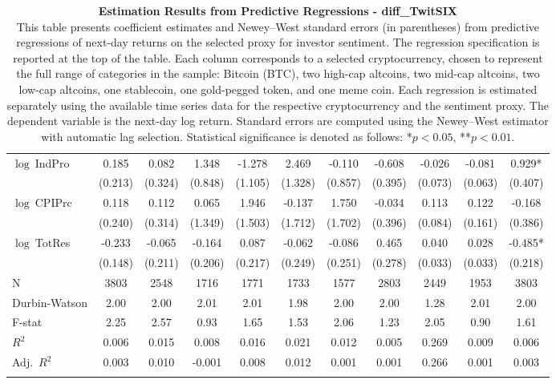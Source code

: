 \begin{table}[ht]
\begin{tabular}{l *{10}{c}}
\addlinespace
$\log\ $IndPro & 0.185 & 0.082 & 1.348 & -1.278 & 2.469 & -0.110 & -0.608 & -0.026 & -0.081 & 0.929* \\
 & (0.213) & (0.324) & (0.848) & (1.105) & (1.328) & (0.857) & (0.395) & (0.073) & (0.063) & (0.407) \\
\addlinespace
$\log\ $CPIPrc & 0.118 & 0.112 & 0.065 & 1.946 & -0.137 & 1.750 & -0.034 & 0.113 & 0.122 & -0.168 \\
 & (0.240) & (0.314) & (1.349) & (1.503) & (1.712) & (1.702) & (0.396) & (0.084) & (0.161) & (0.386) \\
\addlinespace
$\log\ $TotRes & -0.233 & -0.065 & -0.164 & 0.087 & -0.062 & -0.086 & 0.465 & 0.040 & 0.028 & -0.485* \\
 & (0.148) & (0.211) & (0.206) & (0.217) & (0.249) & (0.251) & (0.278) & (0.033) & (0.033) & (0.218) \\
\addlinespace
\midrule
N & 3803 & 2548 & 1716 & 1771 & 1733 & 1577 & 2803 & 2449 & 1953 & 3803 \\
Durbin-Watson & 2.00 & 2.00 & 2.01 & 2.01 & 1.98 & 2.00 & 2.00 & 1.28 & 2.01 & 2.00 \\
F-stat & 2.25 & 2.57 & 0.93 & 1.65 & 1.53 & 2.06 & 1.23 & 2.05 & 0.90 & 1.61 \\
\(R^2\) & 0.006 & 0.015 & 0.008 & 0.016 & 0.021 & 0.012 & 0.005 & 0.269 & 0.009 & 0.006 \\
Adj.\ \(R^2\) & 0.003 & 0.010 & -0.001 & 0.008 & 0.012 & 0.001 & 0.001 & 0.266 & 0.001 & 0.003 \\
\addlinespace
\midrule
\multicolumn{11}{c}{Specification tested: $R_{i,t+1} = \alpha_i + \beta_{sent} S_t + \phi R_{i,t} + \theta B_{i,t} + \gamma M_t + \varepsilon_{i,t+1}$}\\
\bottomrule
\end{tabular}
\caption{\textbf{Estimation Results from Predictive Regressions - diff_TwitSIX} \\
This table presents coefficient estimates and Newey--West standard errors (in parentheses) from predictive regressions of next-day returns on the selected proxy for investor sentiment. The regression specification is reported at the top of the table. Each column corresponds to a selected cryptocurrency, chosen to represent the full range of categories in the sample: Bitcoin (BTC), two high-cap altcoins, two mid-cap altcoins, two low-cap altcoins, one stablecoin, one gold-pegged token, and one meme coin. Each regression is estimated separately using the available time series data for the respective cryptocurrency and the sentiment proxy. The dependent variable is the next-day log return. Standard errors are computed using the Newey--West estimator with automatic lag selection. Statistical significance is denoted as follows: *$p<0.05$, **$p<0.01$.}
\label{tab:diff_twitsix_result_h1}
\end{table}